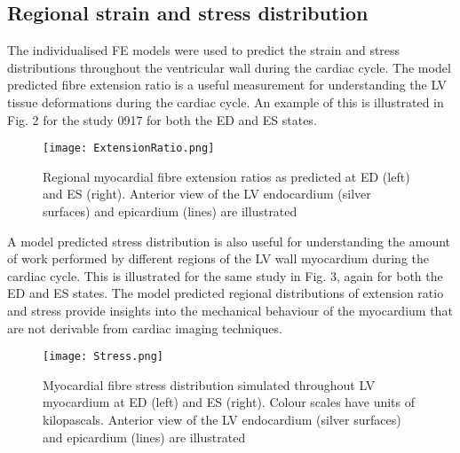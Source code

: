 \documentclass{llncs}
\begin{document}
\subsection{Regional strain and stress distribution}
The individualised FE models were used to predict the strain and stress distributions throughout the ventricular wall during the cardiac cycle. The model predicted fibre extension ratio is a useful measurement for understanding the LV tissue deformations during the cardiac cycle. An example of this is illustrated in Fig. 2 for the study 0917 for both the ED and ES states.

\begin{figure}[H]
	\centering
	\caption[]{Regional myocardial fibre extension ratios as predicted at ED (left) and ES (right). Anterior view of the LV endocardium (silver surfaces) and epicardium (lines) are illustrated}
	\texttt{[image: ExtensionRatio.png]}
\end{figure}
 
 A model predicted stress distribution is also useful for understanding the amount of work performed by different regions of the LV wall myocardium during the cardiac cycle. This is illustrated for the same study in Fig. 3, again for both the ED and ES states. The model predicted regional distributions of extension ratio and stress provide insights into the mechanical behaviour of the myocardium that are not derivable from cardiac imaging techniques. 
  
\begin{figure}[H]
	\centering
	\caption[]{Myocardial fibre stress distribution simulated throughout LV myocardium at ED (left) and ES (right). Colour scales have units of kilopascals. Anterior view of the LV endocardium (silver surfaces) and epicardium (lines) are illustrated}
	\texttt{[image: Stress.png]}
\end{figure}

\end{document}
